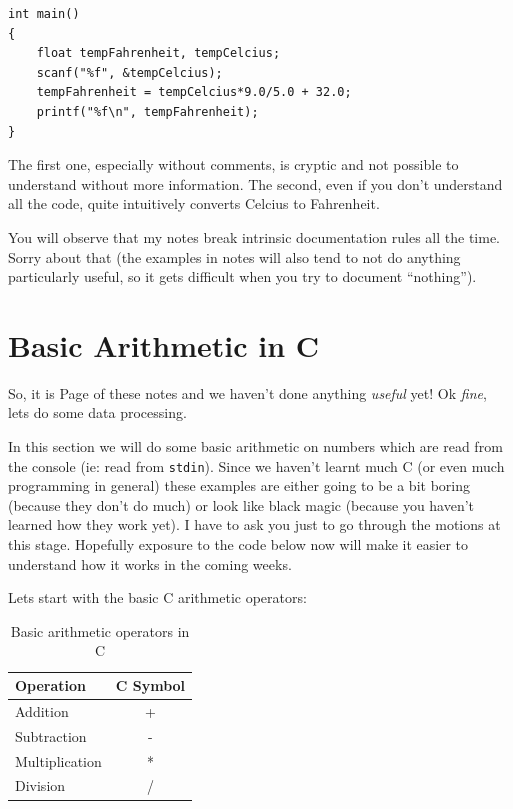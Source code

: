 \documentclass{lab}
\begin{document}
\begin{lstlisting}[style=CStyle]
int main()
{
	float tempFahrenheit, tempCelcius;
	scanf("%f", &tempCelcius);
	tempFahrenheit = tempCelcius*9.0/5.0 + 32.0;
	printf("%f\n", tempFahrenheit);
}
\end{lstlisting}

The first one, especially without comments, is cryptic and not possible to understand without more information. The second, even if you don't understand all the code, quite intuitively converts Celcius to Fahrenheit.

You will observe that my notes break intrinsic documentation rules all the time. Sorry about that (the examples in notes will also tend to not do anything particularly useful, so it gets difficult when you try to document ``nothing'').

\pagebreak
\section{Basic Arithmetic in C}

So, it is Page \thepage{} of these notes and we haven't done anything \textit{useful} yet! Ok \textit{fine}, lets do some data processing.

In this section we will do some basic arithmetic on numbers which are read from the console (ie: read from \texttt{stdin}). Since we haven't learnt much C (or even much programming in general) these examples are either going to be a bit boring (because they don't do much) or look like black magic (because you haven't learned how they work yet). I have to ask you just to go through the motions at this stage. Hopefully exposure to the code below now will make it easier to understand how it works in the coming weeks.

Lets start with the basic C arithmetic operators:

\begin{table}[H]
\centering
\begin{tabular}{|l|c|}
\hline
Operation      & C Symbol \\
\hline
Addition       & +        \\
Subtraction    & -        \\
Multiplication & *        \\
Division       & /       \\
\hline
\end{tabular}
\caption{Basic arithmetic operators in C}
\end{table}
\end{document}
